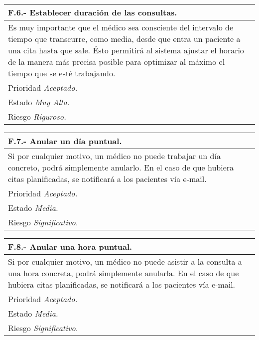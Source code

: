 	\begin{center}
	\begin{tabulary}{15cm}{|L|}
		\hline
			\bf{F.6.- Establecer duración de las consultas.} \\
		\hline
			Es muy importante que el médico sea consciente del intervalo de tiempo que transcurre, como media, desde que entra un paciente a una cita hasta que sale. Ésto permitirá al sistema ajustar el horario de la manera más precisa posible para optimizar al máximo el tiempo que se esté trabajando. \\
		\hline
			Prioridad \textit{Aceptado.} \\
		\hline
			Estado \textit{Muy Alta.} \\
		\hline
			Riesgo \textit{Riguroso.} \\
		\hline
	\end{tabulary}
	\end{center}

	\begin{center}
	\begin{tabulary}{15cm}{|L|}
		\hline
			\bf{F.7.- Anular un día puntual.} \\
		\hline
			Si por cualquier motivo, un médico no puede trabajar un día concreto, podrá simplemente anularlo. En el caso de que hubiera citas planificadas, se notificará a los pacientes vía e-mail. \\
		\hline
			Prioridad \textit{Aceptado.} \\
		\hline
			Estado \textit{Media.} \\
		\hline
			Riesgo \textit{Significativo.} \\
		\hline
	\end{tabulary}
	\end{center}

	\begin{center}
	\begin{tabulary}{15cm}{|L|}
		\hline
			\bf{F.8.- Anular una hora puntual.} \\
		\hline
			Si por cualquier motivo, un médico no puede asistir a la consulta a una hora concreta, podrá simplemente anularla. En el caso de que hubiera citas planificadas, se notificará a los pacientes vía e-mail. \\
		\hline
			Prioridad \textit{Aceptado.} \\
		\hline
			Estado \textit{Media.} \\
		\hline
			Riesgo \textit{Significativo.} \\
		\hline
	\end{tabulary}
	\end{center}

